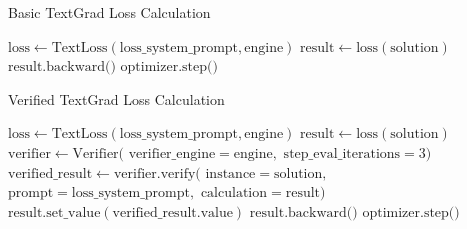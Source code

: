 \documentclass{article}
\begin{document}
\begin{algorithm}
\caption{Basic TextGrad Loss Calculation}
\begin{algorithmic}[1]
\State $\text{loss} \gets \text{TextLoss}(\text{loss\_system\_prompt}, \text{engine})$
\State $\text{result} \gets \text{loss}(\text{solution})$
\State $\text{result.backward()}$
\State $\text{optimizer.step()}$
\end{algorithmic}
\end{algorithm}

\vspace{1em}

\begin{algorithm}
\caption{Verified TextGrad Loss Calculation}
\begin{algorithmic}[1]
\State $\text{loss} \gets \text{TextLoss}(\text{loss\_system\_prompt}, \text{engine})$
\State $\text{result} \gets \text{loss}(\text{solution})$
\State $\text{verifier} \gets \text{Verifier}($
\State \hspace{2cm} $\text{verifier\_engine} = \text{engine},$
\Statex \hspace{2cm} $\text{step\_eval\_iterations} = 3)$
\State $\text{verified\_result} \gets \text{verifier.verify}($
\Statex \hspace{2cm} $\text{instance} = \text{solution},$
\Statex \hspace{2cm} $\text{prompt} = \text{loss\_system\_prompt},$
\Statex \hspace{2cm} $\text{calculation} = \text{result})$
\State $\text{result.set\_value}(\text{verified\_result.value})$
\State $\text{result.backward()}$
\State $\text{optimizer.step()}$
\end{algorithmic}
\end{algorithm}
\end{document}
